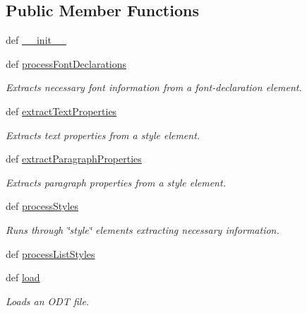 \subsection*{Public Member Functions}
\begin{DoxyCompactItemize}
\item 
def \hyperlink{classodf_1_1odf2moinmoin_1_1ODF2MoinMoin_abbecc3bfc729a54df4141635f61894bf}{\+\_\+\+\_\+init\+\_\+\+\_\+}
\item 
def \hyperlink{classodf_1_1odf2moinmoin_1_1ODF2MoinMoin_a3d7cf4306b6fbfa8fc2ea92d012d271a}{process\+Font\+Declarations}
\begin{DoxyCompactList}\small\item\em Extracts necessary font information from a font-\/declaration element. \end{DoxyCompactList}\item 
def \hyperlink{classodf_1_1odf2moinmoin_1_1ODF2MoinMoin_a685a84d1f5ce34195dd54787cac3e4b5}{extract\+Text\+Properties}
\begin{DoxyCompactList}\small\item\em Extracts text properties from a style element. \end{DoxyCompactList}\item 
def \hyperlink{classodf_1_1odf2moinmoin_1_1ODF2MoinMoin_ac5d37970518c2754d690e848f9266694}{extract\+Paragraph\+Properties}
\begin{DoxyCompactList}\small\item\em Extracts paragraph properties from a style element. \end{DoxyCompactList}\item 
def \hyperlink{classodf_1_1odf2moinmoin_1_1ODF2MoinMoin_a2eec52acd99c4c06eb85578e13d58e73}{process\+Styles}
\begin{DoxyCompactList}\small\item\em Runs through \char`\"{}style\char`\"{} elements extracting necessary information. \end{DoxyCompactList}\item 
def \hyperlink{classodf_1_1odf2moinmoin_1_1ODF2MoinMoin_ac8cc4d4f8722e7d071a98040623c3baa}{process\+List\+Styles}
\item 
def \hyperlink{classodf_1_1odf2moinmoin_1_1ODF2MoinMoin_aab6e8e37a95662a023697cfbeefef367}{load}
\begin{DoxyCompactList}\small\item\em Loads an O\+D\+T file. \end{DoxyCompactList}\item 

\end{DoxyCompactItemize}
